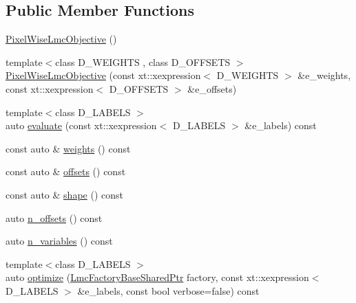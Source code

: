 \subsection*{Public Member Functions}
\begin{DoxyCompactItemize}
\item 
\hyperlink{classnifty_1_1graph_1_1opt_1_1lifted__multicut_1_1PixelWiseLmcObjective_a9ca29aebe51f087b87d9353b72e5b4f3}{Pixel\+Wise\+Lmc\+Objective} ()
\item 
{\footnotesize template$<$class D\+\_\+\+W\+E\+I\+G\+H\+TS , class D\+\_\+\+O\+F\+F\+S\+E\+TS $>$ }\\\hyperlink{classnifty_1_1graph_1_1opt_1_1lifted__multicut_1_1PixelWiseLmcObjective_a289a981e481ffd785ff9e902a1c6b81c}{Pixel\+Wise\+Lmc\+Objective} (const xt\+::xexpression$<$ D\+\_\+\+W\+E\+I\+G\+H\+TS $>$ \&e\+\_\+weights, const xt\+::xexpression$<$ D\+\_\+\+O\+F\+F\+S\+E\+TS $>$ \&e\+\_\+offsets)
\item 
{\footnotesize template$<$class D\+\_\+\+L\+A\+B\+E\+LS $>$ }\\auto \hyperlink{classnifty_1_1graph_1_1opt_1_1lifted__multicut_1_1PixelWiseLmcObjective_a747f137d69865cae987d39e3d1f7d8da}{evaluate} (const xt\+::xexpression$<$ D\+\_\+\+L\+A\+B\+E\+LS $>$ \&e\+\_\+labels) const
\item 
const auto \& \hyperlink{classnifty_1_1graph_1_1opt_1_1lifted__multicut_1_1PixelWiseLmcObjective_ad84609a85d2203e52d4eb16c83a3930f}{weights} () const
\item 
const auto \& \hyperlink{classnifty_1_1graph_1_1opt_1_1lifted__multicut_1_1PixelWiseLmcObjective_a1c9506b64a31e69ffe33ce76e94a3399}{offsets} () const
\item 
const auto \& \hyperlink{classnifty_1_1graph_1_1opt_1_1lifted__multicut_1_1PixelWiseLmcObjective_a7d7e653cc95b721c529a397652e36b9a}{shape} () const
\item 
auto \hyperlink{classnifty_1_1graph_1_1opt_1_1lifted__multicut_1_1PixelWiseLmcObjective_a8362f64cc0d7898d9fb9d7350cf85ce7}{n\+\_\+offsets} () const
\item 
auto \hyperlink{classnifty_1_1graph_1_1opt_1_1lifted__multicut_1_1PixelWiseLmcObjective_abb3ae8311e13fc58cf745ba0e232a2e9}{n\+\_\+variables} () const
\item 
{\footnotesize template$<$class D\+\_\+\+L\+A\+B\+E\+LS $>$ }\\auto \hyperlink{classnifty_1_1graph_1_1opt_1_1lifted__multicut_1_1PixelWiseLmcObjective_a5d81f386676196f07d1b44cbfaac487a}{optimize} (\hyperlink{classnifty_1_1graph_1_1opt_1_1lifted__multicut_1_1PixelWiseLmcObjective_aed7d162d3b82b26428c3e484d7788fc9}{Lmc\+Factory\+Base\+Shared\+Ptr} factory, const xt\+::xexpression$<$ D\+\_\+\+L\+A\+B\+E\+LS $>$ \&e\+\_\+labels, const bool verbose=false) const

\end{DoxyCompactItemize}
